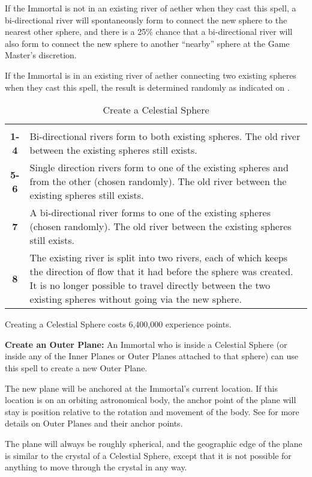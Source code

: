 \begin{multicols*}{2}
If the Immortal is not in an existing river of aether when they cast this spell, a bi-directional river will spontaneously form to connect the new sphere to the nearest other sphere, and there is a 25\% chance that a bi-directional river will also form to connect the new sphere to another “nearby” sphere at the Game Master’s discretion.

If the Immortal is in an existing river of aether connecting two existing spheres when they cast this spell, the result is determined randomly as indicated on .

\begin {table}[H]
  \caption{Create a Celestial Sphere}\label{tab:Create a Celestial Sphere}
  \begin{tabularx}{\columnwidth}{>{\bfseries}cY}
	 & \\
	1-4 & Bi-directional rivers form to both existing spheres. The old river between the existing spheres still exists.\\
	5-6 & Single direction rivers form to one of the existing spheres and from the other (chosen randomly). The old river between the existing spheres still exists.\\
	7 & A bi-directional river forms to one of the existing spheres (chosen randomly). The old river between the existing spheres still exists.\\
	8 & The existing river is split into two rivers, each of which keeps the direction of flow that it had before the sphere was created. It is no longer possible to travel directly between the two existing spheres without going via the new sphere.
  \end {tabularx}
\end {table}

Creating a Celestial Sphere costs 6,400,000 experience points.

\textbf{Create an Outer Plane:} An Immortal who is inside a Celestial Sphere (or inside any of the Inner Planes or Outer Planes attached to that sphere) can use this spell to create a new Outer Plane.

The new plane will be anchored at the Immortal’s current location. If this location is on an orbiting astronomical body, the anchor point of the plane will stay is position relative to the rotation and movement of the body. See  for more details on Outer Planes and their anchor points.

The plane will always be roughly spherical, and the geographic edge of the plane is similar to the crystal of a Celestial Sphere, except that it is not possible for anything to move through the crystal in any way.


\end{multicols*}
